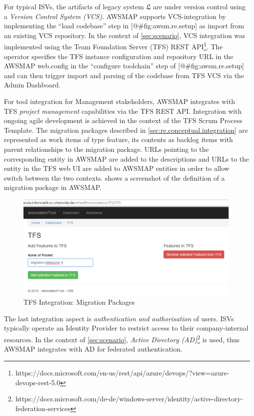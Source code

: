 For typical ISVs, the artifacts of legacy system \(\mathfrak{L}\) are under version control using a \emph{Version Control System (VCS)}.
AWSMAP supports VCS-integration by implementing the ``load codebase'' step in {[}@\#fig:awsm.re.setup{]} as import from an existing VCS repository.
In the context of \cref{sec:scenario}, VCS integration was implemented using the Team Foundation Server (TFS) REST API\footnote{https://docs.microsoft.com/en-us/rest/api/azure/devops/?view=azure-devops-rest-5.0}.
The operator specifies the TFS instance configuration and repository URL in the AWSMAP web.config in the ``configure toolchain'' step of {[}@\#fig:awsm.re.setup{]} and can then trigger import and parsing of the codebase from TFS VCS via the Admin Dashboard.

For tool integration for Management stakeholders, AWSMAP integrates with TFS \emph{project management} capabilities via the TFS REST API.
Integration with ongoing agile development is achieved in the context of the TFS Scrum Process Template.
The migration packages described in \cref{sec:re.conceptual.integration} are represented as work items of type feature, its contents as backlog items with parent relationships to the migration package.
URLs pointing to the corresponding entity in AWSMAP are added to the descriptions and URLs to the entity in the TFS web UI are added to AWSMAP entities in order to allow switch between the two contexts.
 shows a screenshot of the definition of a migration package in AWSMAP.

\begin{figure}
\hypertarget{fig:tfs-integration}{%
\centering
\includegraphics[width=0.99\textwidth]{../figures/screenshots/tfs-integration-migrationpackages.png}
\caption{TFS Integration: Migration Packages}\label{fig:tfs-integration}
}
\end{figure}

The last integration aspect is \emph{authentication and authorisation} of users.
ISVs typically operate an Identity Provider to restrict access to their company-internal resources.
In the context of \cref{sec:scenario}, \emph{Active Directory (AD)}\footnote{https://docs.microsoft.com/de-de/windows-server/identity/active-directory-federation-services} is used, thus AWSMAP integrates with AD for federated authentication.

